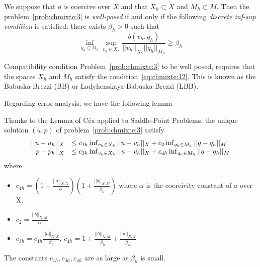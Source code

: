   \begin{theorem}
    \label{thr:chmixte:2}
    We suppose that $a$ is coercive over $X$ and that $X_h \subset X$ and $M_h
    \subset M$. Then the problem~\ref{prob:chmixte:3} is \emph{well-posed} if and only
    if the following \emph{discrete inf-sup condition}  is satisfied: there
    exists $\beta_h  > 0$ such that
    \begin{equation}
      \label{eq:chmixte:12}
      \inf_{q_h \in M_h} \sup_{v_h \in X_h} \frac{b(v_h,q_h)}{||v_h||_{X_h} ||q_h||_{M_h}} \geq \beta_h
    \end{equation}
  \end{theorem}

  \begin{remark}{Compatibility condition}
    Problem~\ref{prob:chmixte:3} to be well posed, requires that the spaces $X_h$ and
    $M_h$ satisfy the condition~\eqref{eq:chmixte:12}. This is known as the
    Babuska-Brezzi (BB) or Ladyhenskaya-Babuska-Brezzi (LBB).
  \end{remark}


  Regarding error analysis, we have the following lemma
  \begin{lemma}
    \label{lem:1}
      Thanks to the Lemma of Céa applied to Saddle-Point Problems, the unique
      solution $(u,p)$ of problem~\ref{prob:chmixte:3}  satisfy
      \begin{equation}
        \label{eq:chmixte:13}
        \begin{array}[c]{rl}
          ||u-u_h||_X & \leq c_{1h} \inf_{v_h \in X_h}  ||u-v_h||_X + c_{2}
          \inf_{q_h \in M_h}  ||q-q_h||_M\\
          ||p-p_h||_X & \leq c_{3h} \inf_{v_h \in X_h}  ||u-v_h||_X + c_{4h} \inf_{q_h \in M_h}  ||q-q_h||_M
        \end{array}
      \end{equation}
      where
      \begin{itemize}
      \item $c_{1h} =
        (1+\frac{||a||_{X,X}}{\alpha})(1+\frac{||b||_{X,M}}{\beta_h})$ where
        $\alpha$ is the coercivity constant of $a$ over X.
      \item $c_{2} = \frac{||b||_{X,M}}{\alpha}$
      \item $c_{3h} = c_{1h} \frac{||a||_{X,X}}{\beta_h}$, $c_{4h} = 1+ \frac{||b||_{X,M}}{\beta_h}+\frac{||a||_{X,X}}{\beta_h}$
      \end{itemize}
  \end{lemma}
  \begin{remark}
    The constants $c_{1h}, c_{3h}, c_{4h}$ are as large as $\beta_h$ is small.
  \end{remark}



